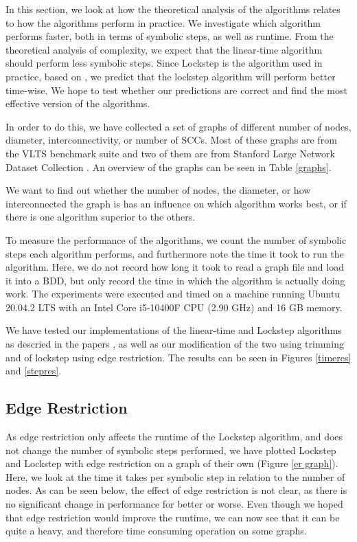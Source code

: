 \documentclass[../master/master.tex]{subfiles}
\begin{document}

In this section, we look at how the theoretical analysis of the algorithms relates to how the algorithms perform in practice. We investigate which algorithm performs faster, both in terms of symbolic steps, as well as runtime. From the theoretical analysis of complexity, we expect that the linear-time algorithm should perform less symbolic steps. Since Lockstep is the algorithm used in practice, based on , we predict that the lockstep algorithm will perform better time-wise. We hope to test whether our predictions are correct and find the most effective version of the algorithms.

In order to do this, we have collected a set of graphs of different number of nodes, diameter, interconnectivity, or number of SCCs. Most of these graphs are from the VLTS benchmark suite \cite{vlts} and two of them are from Stanford Large Network Dataset Collection \cite{snapnets}. An overview of the graphs can be seen in Table \ref{graphs}. 
 
We want to find out whether the number of nodes, the diameter, or how interconnected the graph is has an influence on which algorithm works best, or if there is one algorithm superior to the others.

To measure the performance of the algorithms, we count the number of symbolic steps each algorithm performs, and furthermore note the time it took to run the algorithm. Here, we do not record how long it took to read a graph file and load it into a BDD, but only record the time in which the algorithm is actually doing work. The experiments were executed and timed on a machine running Ubuntu 20.04.2 LTS with an Intel Core i5-10400F CPU (2.90 GHz) and 16 GB memory.

We have tested our implementations of the linear-time and Lockstep algorithms as descried in the papers \cite{linear}\cite{lockstep}, as well as our modification of the two using trimming and of lockstep using edge restriction. The results can be seen in Figures \ref{timeres} and \ref{stepres}.

\subsection{Edge Restriction}
As edge restriction only affects the runtime of the Lockstep algorithm, and does not change the number of symbolic steps performed, we have plotted Lockstep and Lockstep with edge restriction on a graph of their own (Figure \ref{er graph}). Here, we look at the time it takes per symbolic step in relation to the number of nodes. As can be seen below, the effect of edge restriction is not clear, as there is no significant change in performance for better or worse. Even though we hoped that edge restriction would improve the runtime, we can now see that it can be quite a heavy, and therefore time consuming operation on some graphs.
\end{document}
